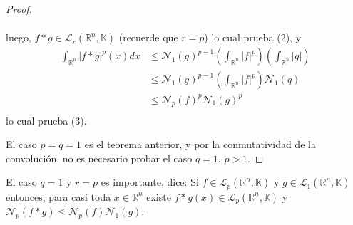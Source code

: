 \documentclass[12pt]{report}
\theoremstyle{largebreak}
\newcommand\abs[1]{\ensuremath{\big|#1\big|}}
\newcommand{\N}[2]{\ensuremath{\mathcal{N}_{#1}\left(#2\right)}}
\begin{document}
\begin{proof}
\begin{enumerate}
\begin{equation*}
\begin{split}
                \end{split}
            \end{equation*}
            luego, $f*g\in\mathcal{L}_r(\mathbb{R}^n,\mathbb{K})$ (recuerde que $r=p$) lo cual prueba (2), y
            \begin{equation*}
                \begin{split}
                    \int_{\mathbb{R}^n}\abs{f*g}^p(x)dx&\leq\N{1}{g}^{p-1}\left(\int_{\mathbb{R}^n}\abs{f}^p \right)\left(\int_{\mathbb{R}^n}\abs{g} \right)\\
                    &\leq\N{1}{g}^{p-1}\left(\int_{\mathbb{R}^n}\abs{f}^p \right)\N{1}{q}\\
                    &\leq\N{p}{f}^p\N{1}{g}^{p} \\
                \end{split}
            \end{equation*}
            lo cual prueba (3).
        \end{enumerate}

        El caso $p=q=1$ es el teorema anterior, y por la conmutatividad de la convolución, no es necesario probar el caso $q=1$, $p>1$.
    \end{proof}

    \begin{obs}
        El caso $q=1$ y $r=p$ es importante, dice: Si $f\in\mathcal{L}_p(\mathbb{R}^n,\mathbb{K})$ y $g\in\mathcal{L}_1(\mathbb{R}^n,\mathbb{K})$ entonces, para casi toda $x\in\mathbb{R}^n$ existe $f*g(x)\in\mathcal{L}_p(\mathbb{R}^n,\mathbb{K})$ y $\N{p}{f*g}\leq\N{p}{f}\N{1}{g}$.
    \end{obs}
\end{document}

